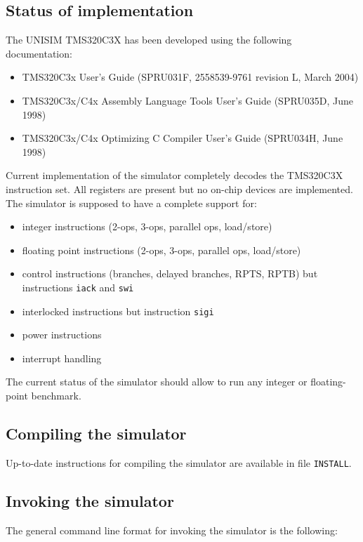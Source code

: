 \subsection{Status of implementation}

The UNISIM TMS320C3X has been developed using the following documentation:
\begin{itemize}
\item TMS320C3x User’s Guide (SPRU031F, 2558539-9761 revision L, March 2004)
\item TMS320C3x/C4x Assembly Language Tools User’s Guide (SPRU035D, June 1998)
\item TMS320C3x/C4x Optimizing C Compiler User’s Guide (SPRU034H, June 1998)
\end{itemize}

Current implementation of the simulator completely decodes the TMS320C3X instruction set.
All registers are present but no on-chip devices are implemented.
The simulator is supposed to have a complete support for:
\begin{itemize}
\item integer instructions (2-ops, 3-ops, parallel ops, load/store)
\item floating point instructions (2-ops, 3-ops, parallel ops, load/store)
\item control instructions (branches, delayed branches, RPTS, RPTB) but instructions \texttt{iack} and \texttt{swi}
\item interlocked instructions but instruction \texttt{sigi}
\item power instructions
\item interrupt handling
\end{itemize}

The current status of the simulator should allow to run any integer or floating-point benchmark.

\subsection{Compiling the simulator}

Up-to-date instructions for compiling the simulator are available in file \texttt{INSTALL}.

\subsection{Invoking the simulator}

The general command line format for invoking the simulator is the following:


